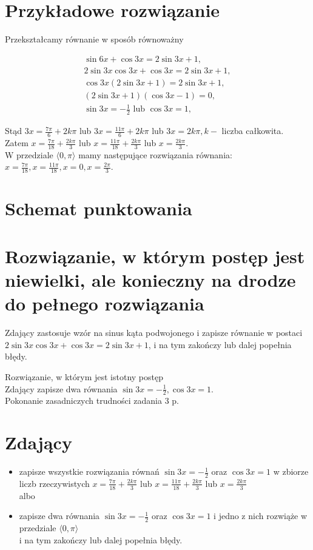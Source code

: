 \documentclass[10pt]{article}
\begin{document}
\section*{Przykładowe rozwiązanie}
Przekształcamy równanie w sposób równoważny

$$
\begin{gathered}
\sin 6 x+\cos 3 x=2 \sin 3 x+1, \\
2 \sin 3 x \cos 3 x+\cos 3 x=2 \sin 3 x+1, \\
\cos 3 x(2 \sin 3 x+1)=2 \sin 3 x+1, \\
(2 \sin 3 x+1)(\cos 3 x-1)=0, \\
\sin 3 x=-\frac{1}{2} \text { lub } \cos 3 x=1,
\end{gathered}
$$

Stąd $3 x=\frac{7 \pi}{6}+2 k \pi$ lub $3 x=\frac{11 \pi}{6}+2 k \pi$ lub $3 x=2 k \pi, k-$ liczba całkowita.\\
Zatem $x=\frac{7 \pi}{18}+\frac{2 k \pi}{3}$ lub $x=\frac{11 \pi}{18}+\frac{2 k \pi}{3}$ lub $x=\frac{2 k \pi}{3}$.\\
W przedziale $\langle 0, \pi\rangle$ mamy następujące rozwiązania równania: $x=\frac{7 \pi}{18}, x=\frac{11 \pi}{18}, x=0, x=\frac{2 \pi}{3}$.

\section*{Schemat punktowania}
\section*{Rozwiązanie, w którym postęp jest niewielki, ale konieczny na drodze do pełnego rozwiązania}
Zdający zastosuje wzór na sinus kąta podwojonego i zapisze równanie w postaci $2 \sin 3 x \cos 3 x+\cos 3 x=2 \sin 3 x+1$, i na tym zakończy lub dalej popełnia błędy.

Rozwiązanie, w którym jest istotny postęp\\
Zdający zapisze dwa równania $\sin 3 x=-\frac{1}{2}, \cos 3 x=1$.\\
Pokonanie zasadniczych trudności zadania 3 p.

\section*{Zdający}
\begin{itemize}
  \item zapisze wszystkie rozwiązania równań $\sin 3 x=-\frac{1}{2}$ oraz $\cos 3 x=1$ w zbiorze liczb rzeczywistych $x=\frac{7 \pi}{18}+\frac{2 k \pi}{3}$ lub $x=\frac{11 \pi}{18}+\frac{2 k \pi}{3}$ lub $x=\frac{2 k \pi}{3}$\\
albo
  \item zapisze dwa równania $\sin 3 x=-\frac{1}{2}$ oraz $\cos 3 x=1$ i jedno z nich rozwiąże w przedziale $\langle 0, \pi\rangle$\\
i na tym zakończy lub dalej popełnia błędy.
\end{itemize}
\end{document}
